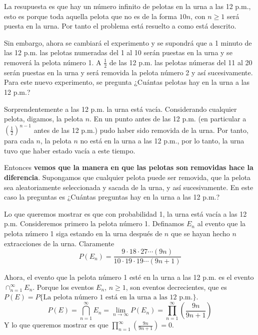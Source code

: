 \documentclass[11pt,letterpaper]{report}
\begin{document}
\begin{enumerate}
La resupuesta es que hay un número infinito de pelotas en la urna a las 12 p.m., esto es porque toda
aquella pelota que no es de la forma $10n$, con $n \geq 1$ será puesta en la urna. Por tanto el 
problema está resuelto a como está descrito.

Sin embargo, ahora se cambiará el experimento y se supondrá que a 1 minuto de las 12 p.m. las
pelotas numeradas del 1 al 10 serán puestas en la urna y se removerá la pelota número 1. A
$\frac{1}{2}$ de las 12 p.m. las pelotas númeras del 11 al 20 serán puestas en la urna y será
removida la pelota número 2 y así sucesivamente. Para este nuevo experimento, se pregunta
¿Cuántas pelotas hay en la urna a las 12 p.m.?

Sorprendentemente a las 12 p.m. la urna está vacía. Considerando cualquier pelota, digamos, la
pelota $n$. En un punto antes de las 12 p.m. (en particular a $(\frac{1}{2})^{n-1}$ antes de las
12 p.m.) pudo haber sido removida de la urna. Por tanto, para cada $n$, la pelota $n$ no está en la
urna a las 12 p.m., por lo tanto, la urna tuvo que haber estado vacía a este tiempo.

Entonces \textbf{vemos que la manera en que las pelotas son removidas hace la diferencia}.
Supongamos que cualquier pelota puede ser removida, que la pelota sea aleatoriamente seleccionada
y sacada de la urna, y así sucesivamente. En este caso la preguntas es ¿Cuántas preguntas hay en
la urna a las 12 p.m.?

Lo que queremos mostrar es que con probabilidad 1, la urna está vacía a las 12 p.m. Consideremos
primero la pelota número 1. Definamos $E_n$ al evento que la pelota número 1 siga estando en la urna
después de $n$ que se hayan hecho $n$ extracciones de la urna. Claramente
$$P(E_n) = \frac{9 \cdot 18 \cdot 27 \cdots (9n)}{10 \cdot 19 \cdot 19 \cdots (9n+1)}$$

Ahora, el evento que la pelota número 1 esté en la urna a las 12 p.m. es el evento
$\cap_{n=1}^{\infty} E_n$. Porque los eventos $E_n$, $n \geq 1$, son eventos decrecientes, que es
$P(E) = P\{ \text{La pelota número 1 está en la urna a las 12 p.m.} \}$.
\[
    P(E) = \bigcap_{n=1}^{\infty} E_n = \lim_{n \to \infty} P(E_n) =
    \prod_{n=1}^{\infty} (\frac{9n}{9n+1})
\]
Y lo que queremos mostrar es que $\prod_{n=1}^{\infty} (\frac{9n}{9n+1}) = 0$.


\end{enumerate}
\end{document}
